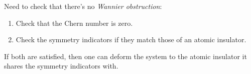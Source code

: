 \documentclass{beamer}
\renewcommand{\(}{\left(}
\renewcommand{\)}{\right)}
\renewcommand{\[}{\left[}
\renewcommand{\]}{\right]}
\begin{document}
\begin{frame}
    Need to check that there's no \emph{Wannier obstruction}:
    \begin{enumerate}
        \item Check that the Chern number is zero. 
        \item Check the symmetry indicators if they match those of an atomic insulator. \pause
    \end{enumerate}
    \begin{framed}
        If both are satisfied, then one can deform the system to the atomic insulator it shares the symmetry indicators with.
    \end{framed}
\end{frame}
\end{document}
